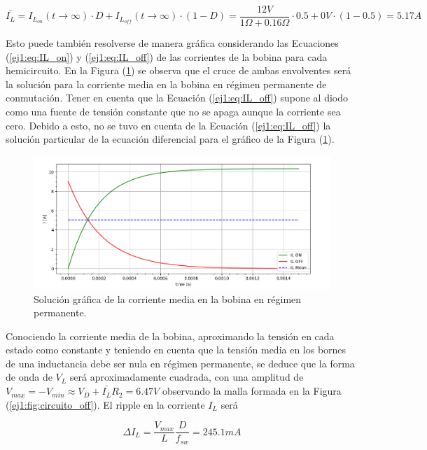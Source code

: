 \begin{equation}
	\bar{I_L} = I_{L_{on}}(t \rightarrow \infty) \cdot D + I_{L_{off}}(t \rightarrow \infty) \cdot (1-D) = \frac{12V}{1\Omega + 0.16\Omega} \cdot 0.5 + 0V \cdot (1-0.5) = 5.17A
\label{ej1:eq:ilbar}
\end{equation}

Esto puede también resolverse de manera gráfica considerando las Ecuaciones (\ref{ej1:eq:IL_on}) y (\ref{ej1:eq:IL_off}) de las corrientes de la bobina para cada hemicircuito. En la Figura (\ref{ej1:fig:ILmediagrafico}) se observa que el cruce de ambas envolventes será la solución para la corriente media en la bobina en régimen permanente de conmutación. Tener en cuenta que la Ecuación (\ref{ej1:eq:IL_off}) supone al diodo como una fuente de tensión constante que no se apaga aunque la corriente sea cero. Debido a esto, no se tuvo en cuenta de la Ecuación (\ref{ej1:eq:IL_off}) la solución particular de la ecuación diferencial para el gráfico de la Figura (\ref{ej1:fig:ILmediagrafico}).

\begin{figure}[H]
	\centering
	\includegraphics[width=0.8\linewidth]{ImagenesEjercicio-1/solgraficaIL}
	\caption{Solución gráfica de la corriente media en la bobina en régimen permanente.}
	\label{ej1:fig:ILmediagrafico}
\end{figure}

Conociendo la corriente media de la bobina, aproximando la tensión en cada estado como constante y teniendo en cuenta que la tensión media en los bornes de una inductancia debe ser nula en régimen permanente, se deduce que la forma de onda de $V_L$ será aproximadamente cuadrada, con una amplitud de $V_{max} = -V_{min} \approx V_D + \bar{I_L}R_2 = 6.47V$ observando la malla formada en la Figura (\ref{ej1:fig:circuito_off}). El ripple en la corriente $I_L$ será 

\begin{equation}
\Delta I_L = \frac{V_{max}}{L}\frac{D}{f_{sw}} = 245.1mA
\end{equation}

